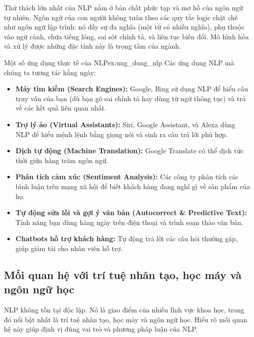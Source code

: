 Thử thách lớn nhất của NLP nằm ở bản chất phức tạp và mơ hồ của ngôn ngữ tự nhiên. Ngôn ngữ của con người không tuân theo các quy tắc logic chặt chẽ như ngôn ngữ lập trình: nó đầy sự đa nghĩa (một từ có nhiều nghĩa), phụ thuộc vào ngữ cảnh, chứa tiếng lóng, sai sót chính tả, và liên tục biến đổi. Mô hình hóa và xử lý được những đặc tính này là trọng tâm của ngành.

\begin{example}{Một số ứng dụng thực tế của NLP}{ex:ung_dung_nlp}
    Các ứng dụng NLP mà chúng ta tương tác hằng ngày:
    \begin{itemize}
        \item \textbf{Máy tìm kiếm (Search Engines):} Google, Bing sử dụng NLP để hiểu câu truy vấn của bạn (dù bạn gõ sai chính tả hay dùng từ ngữ thông tục) và trả về các kết quả liên quan nhất.
        \item \textbf{Trợ lý ảo (Virtual Assistants):} Siri, Google Assistant, và Alexa dùng NLP để hiểu mệnh lệnh bằng giọng nói và sinh ra câu trả lời phù hợp.
        \item \textbf{Dịch tự động (Machine Translation):} Google Translate có thể dịch tức thời giữa hàng trăm ngôn ngữ.
        \item \textbf{Phân tích cảm xúc (Sentiment Analysis):} Các công ty phân tích các bình luận trên mạng xã hội để biết khách hàng đang nghĩ gì về sản phẩm của họ.
        \item \textbf{Tự động sửa lỗi và gợi ý văn bản (Autocorrect \& Predictive Text):} Tính năng bạn dùng hàng ngày trên điện thoại và trình soạn thảo văn bản.
        \item \textbf{Chatbots hỗ trợ khách hàng:} Tự động trả lời các câu hỏi thường gặp, giúp giảm tải cho nhân viên hỗ trợ.
    \end{itemize}
\end{example}

\subsection{Mối quan hệ với trí tuệ nhân tạo, học máy và ngôn ngữ học}
\label{ssec:moi_quan_he}

NLP không tồn tại độc lập. Nó là giao điểm của nhiều lĩnh vực khoa học, trong đó nổi bật nhất là trí tuệ nhân tạo, học máy và ngôn ngữ học. Hiểu rõ mối quan hệ này giúp định vị đúng vai trò và phương pháp luận của NLP.

\begin{center}
\label{fig:venn_diagram}
\end{center}

